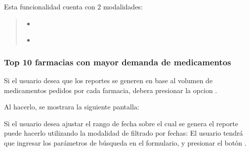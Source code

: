 \documentclass[a4paper,10pt,spanish]{sphinxmanual}
\begin{document}


Esta funcionalidad cuenta con 2 modalidades:
\begin{quote}
\begin{itemize}
\item {} 
{\hyperref[pedidosfarmacia:top10\string-meds\string-pf]{}}

\item {} 
{\hyperref[pedidosfarmacia:top10\string-peds\string-pf]{}}

\end{itemize}
\label{pedidosfarmacia:top10-meds-pf}\end{quote}


\subsubsection{Top 10 farmacias con mayor demanda de medicamentos}
\label{pedidosfarmacia:top-10-farmacias-con-mayor-demanda-de-medicamentos}\label{pedidosfarmacia:top10-meds-pf}
Si el usuario desea que los reportes se generen en base al volumen de medicamentos pedidos por cada farmacia, debera presionar la opcion .


Al hacerlo, se mostrara la siguiente pantalla:


Si el usuario desea ajustar el rango de fecha sobre el cual se genera el reporte puede hacerlo utilizando la modalidad de filtrado por fechas:
El usuario tendrá que ingresar los parámetros de búsqueda en el formulario, y presionar el botón .
\end{document}

